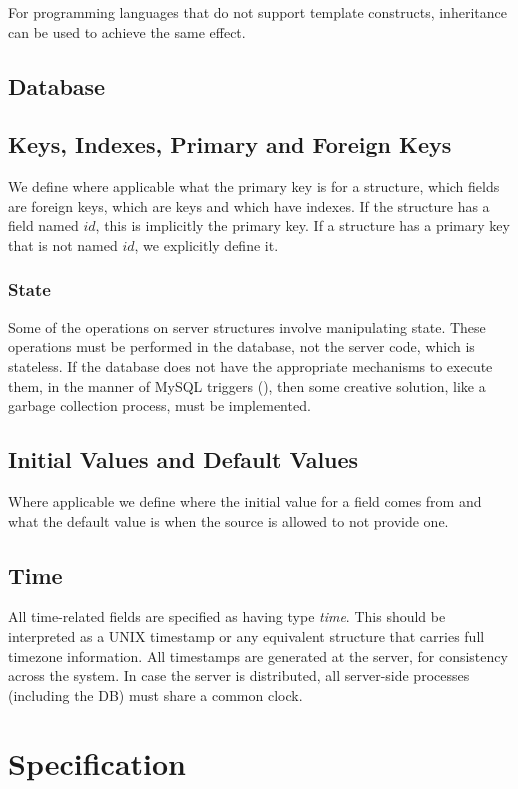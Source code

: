 \documentclass[a4paper,10pt]{article}
\begin{document}
For programming languages that do not support template constructs, inheritance can be used to achieve the same effect.

\subsection{Database}

\subsection{Keys, Indexes, Primary and Foreign Keys}
We define where applicable what the primary key is for a structure, which fields are foreign keys, which are keys and which have indexes. If the structure has a field named $id$, 
this is implicitly the primary key. If a structure has a primary key that is not named $id$, we explicitly define it.

\subsubsection{State}
Some of the operations on server structures involve manipulating state. These operations must be performed in the database, not the 
server code, which is stateless. If the database does not have the appropriate mechanisms to execute them, in the manner of MySQL triggers (\cite{mysql_trigger}), then some 
creative solution, like a garbage collection process, must be implemented.

\subsection{Initial Values and Default Values}
Where applicable we define where the initial value for a field comes from and what the default value is when the source is allowed to not provide one.

\subsection{Time}
All time-related fields are specified as having type {\em time}. This should be interpreted as a UNIX timestamp or any equivalent structure that carries full timezone information. 
All timestamps are generated at the server, for consistency across the system. In case the server is distributed, all server-side processes (including the DB) must share a common 
clock.

\section{Specification}
\end{document}
